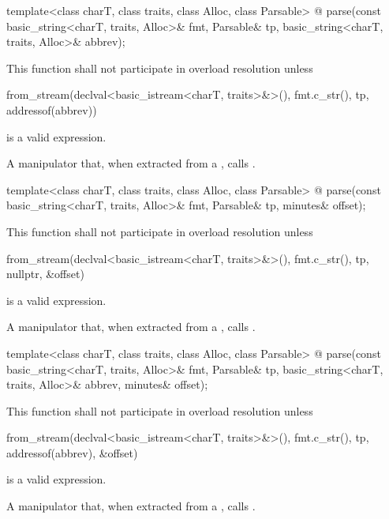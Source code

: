 \begin{itemdecl}
template<class charT, class traits, class Alloc, class Parsable>
  @\unspec@
    parse(const basic_string<charT, traits, Alloc>& fmt, Parsable& tp,
          basic_string<charT, traits, Alloc>& abbrev);
\end{itemdecl}

\begin{itemdescr}
\pnum
\remarks
This function shall not participate in overload resolution unless
\begin{codeblock}
from_stream(declval<basic_istream<charT, traits>&>(), fmt.c_str(), tp, addressof(abbrev))
\end{codeblock}
is a valid expression.

\pnum
\returns
A manipulator that, when extracted from a
 ,
calls .
\end{itemdescr}

\begin{itemdecl}
template<class charT, class traits, class Alloc, class Parsable>
  @\unspec@
    parse(const basic_string<charT, traits, Alloc>& fmt, Parsable& tp,
          minutes& offset);
\end{itemdecl}

\begin{itemdescr}
\pnum
\remarks
This function shall not participate in overload resolution unless
\begin{codeblock}
from_stream(declval<basic_istream<charT, traits>&>(), fmt.c_str(), tp, nullptr, &offset)
\end{codeblock}
is a valid expression.

\pnum
\returns
A manipulator that, when extracted from a
 ,
calls .
\end{itemdescr}

\begin{itemdecl}
template<class charT, class traits, class Alloc, class Parsable>
  @\unspec@
    parse(const basic_string<charT, traits, Alloc>& fmt, Parsable& tp,
          basic_string<charT, traits, Alloc>& abbrev, minutes& offset);
\end{itemdecl}

\begin{itemdescr}
\pnum
\remarks
This function shall not participate in overload resolution unless
\begin{codeblock}
from_stream(declval<basic_istream<charT, traits>&>(),
            fmt.c_str(), tp, addressof(abbrev), &offset)
\end{codeblock}
is a valid expression.

\pnum
\returns
A manipulator that, when extracted from a
 ,
calls .
\end{itemdescr}

